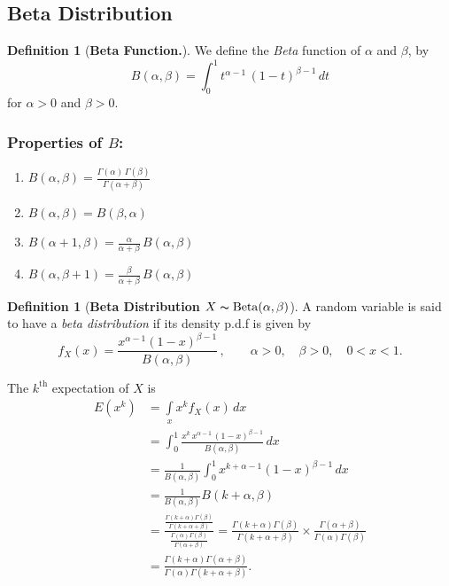 \documentclass[12pt,a4paper]{report}
\theoremstyle{definition}
\newtheorem{definition}[thm]{Definition}
\theoremstyle{plain}
\theoremstyle{definition}
\begin{document}
\subsection{Beta Distribution}
\begin{definition}[\textbf{Beta Function.}]
We define the \textit{Beta} function of $\alpha$ and $\beta$, by \[B(\alpha,\beta) = \int^1_0t^{\alpha-1}\,(1 - t)^{\beta - 1}\, dt\] for $\alpha > 0$ and $\beta > 0$.
\end{definition}



\subsubsection{Properties of $B$:}
\begin{enumerate}
\item $B(\alpha, \beta) = \frac{\Gamma(\alpha)\, \Gamma(\beta)}{\Gamma(\alpha + \beta)}$
\item $B(\alpha, \beta) = B(\beta, \alpha)$
\item $B(\alpha + 1, \beta) = \frac{\alpha}{\alpha + \beta}\, B(\alpha, \beta)$
\item $B(\alpha , \beta + 1) = \frac{\beta}{\alpha + \beta}\, B(\alpha,\beta)$
\end{enumerate}

\begin{definition}[\textbf{Beta Distribution $X\thicksim \operatorname{Beta}(\alpha,\beta)$}]
A random variable is said to have a \textit{beta distribution} if its density p.d.f is given by 
\[f_X(x)=\frac{x^{\alpha -1}(1-x)^{\beta -1}}{B(\alpha,\beta)}\, , \quad\quad\alpha >0, \quad \beta >0, \quad 0<x<1.\]
\end{definition}



The $k^{\text{th}}$ expectation of  $X$ is
\begin{align*}
E(x^k) & = \int\limits_x x^kf_X(x)\,dx\\
& =\int^1_0\frac{x^k\, x^{\alpha-1}\, (1-x)^{\beta-1}}{B(\alpha,\beta)}\,dx\\
       & = \frac{1}{B(\alpha,\beta)}\int^1_0x^{k+\alpha-1}(1-x)^{\beta-1}\,dx\\
       & = \frac{1}{B(\alpha,\beta)}B(k+\alpha,\beta)\\
       & = \frac{\frac{\Gamma(k+\alpha)\Gamma(\beta)}{\Gamma(k+\alpha+\beta)}}{\frac{\Gamma(\alpha)\Gamma(\beta)}{\Gamma(\alpha+\beta)}}
        =\frac{\Gamma(k+\alpha)\Gamma(\beta)}{\Gamma(k+\alpha+\beta)}\times \frac{\Gamma(\alpha+\beta)}{\Gamma(\alpha)\Gamma(\beta)}\\
  & = \frac{\Gamma(k+\alpha)\Gamma(\alpha+\beta)}{\Gamma(\alpha)\Gamma(k+\alpha+\beta)}.
\end{align*}
\end{document}
